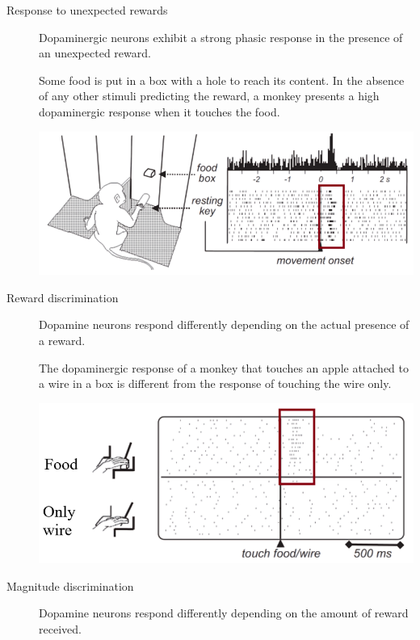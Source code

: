 \begin{description}
    \item[Response to unexpected rewards] 
        Dopaminergic neurons exhibit a strong phasic response in the presence of an unexpected reward.

        \begin{casestudy}
            Some food is put in a box with a hole to reach its content.
            In the absence of any other stimuli predicting the reward, 
            a monkey presents a high dopaminergic response when it touches the food.
            \begin{center}
                \includegraphics[width=0.55\linewidth]{./img/dopamine_monkey1.png}    
            \end{center}
        \end{casestudy}

    \item[Reward discrimination] 
        Dopamine neurons respond differently depending on the actual presence of a reward.

        \begin{casestudy}
            The dopaminergic response of a monkey that touches an apple attached to a wire in a box is different 
            from the response of touching the wire only.
            \begin{center}
                \includegraphics[width=0.5\linewidth]{./img/dopamine_monkey2.png}    
            \end{center}
        \end{casestudy}

    \item[Magnitude discrimination] 
        Dopamine neurons respond differently depending on the amount of reward received.


\end{description}
